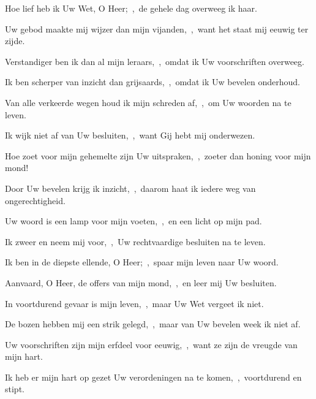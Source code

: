\documentclass[12pt,twoside,a5paper]{article}
\begin{document}
\begin{halfparskip}
   Hoe lief heb ik Uw Wet, O Heer;~\sep\ de gehele dag overweeg ik haar.


  Uw gebod maakte mij wijzer dan mijn vijanden,~\sep\ want het staat mij eeuwig ter zijde.

  Verstandiger ben ik dan al mijn leraars,~\sep\ omdat ik Uw voorschriften overweeg.

  Ik ben scherper van inzicht dan grijsaards,~\sep\ omdat ik Uw bevelen onderhoud.

  Van alle verkeerde wegen houd ik mijn schreden af,~\sep\ om Uw woorden na te leven.

  Ik wijk niet af van Uw besluiten,~\sep\ want Gij hebt mij onderwezen.

  Hoe zoet voor mijn gehemelte zijn Uw uitspraken,~\sep\ zoeter dan honing voor mijn mond!

  Door Uw bevelen krijg ik inzicht,~\sep\ daarom haat ik iedere weg van ongerechtigheid.
\end{halfparskip}

\begin{halfparskip}
   Uw woord is een lamp voor mijn voeten,~\sep\ en een licht op mijn pad.


  Ik zweer en neem mij voor,~\sep\ Uw rechtvaardige besluiten na te leven.

  Ik ben in de diepste ellende, O Heer;~\sep\ spaar mijn leven naar Uw woord.

  Aanvaard, O Heer, de offers van mijn mond,~\sep\ en leer mij Uw besluiten.

  In voortdurend gevaar is mijn leven,~\sep\ maar Uw Wet vergeet ik niet.

  De bozen hebben mij een strik gelegd,~\sep\ maar van Uw bevelen week ik niet af.

  Uw voorschriften zijn mijn erfdeel voor eeuwig,~\sep\ want ze zijn de vreugde van mijn hart.

  Ik heb er mijn hart op gezet Uw verordeningen na te komen,~\sep\ voortdurend en stipt.
\end{halfparskip}
\end{document}

